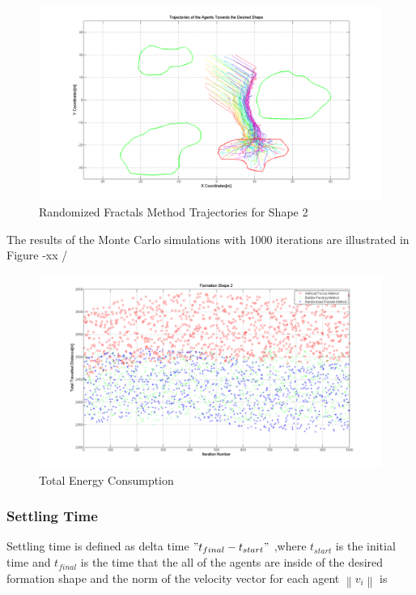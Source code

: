 \documentclass[twoside]{article}
\newcommand{\norm}[1]{\left\lVert#1\right\rVert}
\begin{document}
		   \begin{figure}[H]
		   	\caption{Randomized Fractals Method Trajectories for Shape 2}
		   	\centerline{\includegraphics[scale = 0.35]{Randomized_Trajectories_2}}
		   \end{figure} 	
		   
        The results of the Monte Carlo simulations with 1000 iterations are illustrated in Figure -xx /
		   \begin{figure}[H]
		   	\caption{Total Energy Consumption}
		   	\centerline{\includegraphics[scale = 0.35]{Total_Energy_Shape_2}}
		   \end{figure} 	
		   
		
		
		
		  \subsubsection{Settling Time} 
		
		Settling time is defined as delta time $"t_{final} - t_{start}"$ ,where $t_{start}$ is the initial time and $t_{final}$ is the time that the all of the agents are inside of the desired formation shape and the norm of the velocity vector for each agent $\norm{v_i}$ is
		
\end{document}
